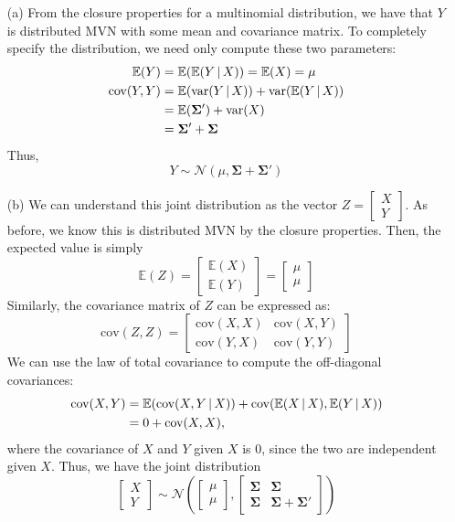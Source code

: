 \documentclass[submit]{harvardml}
\newcommand{\E}{\mathbb{E}}
\newcommand{\cov}{\text{cov}}
\renewcommand{\v}[1]{\mathbf{#1}}
\begin{document}
\begin{enumerate}
	\item[(a)] From the closure properties for a multinomial distribution, we have that $Y$ is distributed MVN with some mean and covariance matrix. To completely specify the distribution, we need only compute these two parameters:
	\begin{align*}
	\E(Y) &= \E(\E(Y\given X))  = \E(X) = \mu \\
	\cov(Y, Y) &= \E(\var(Y\given X)) + \var(\E(Y\given X)) \\
	&= \E(\v\Sigma') + \var(X) \\
	&= \v\Sigma' + \v{\Sigma}
	\end{align*}
	Thus,
	\[Y\sim\mathcal{N}(\mu, \v{\Sigma + \v{\Sigma'}})\]
	
	\item[(b)] We can understand this joint distribution as the vector 
	$Z = \begin{bmatrix} X \\ Y\end{bmatrix}$. As before, we know this is distributed MVN by the closure properties. Then, the expected value is simply
	\[ \E(Z) 
	= \begin{bmatrix} \E(X) \\ \E(Y)\end{bmatrix} 
	= \begin{bmatrix} \mu \\ \mu\end{bmatrix} \]
	Similarly, the covariance matrix of $Z$ can be expressed as:
	\[ \cov(Z, Z)
	= \begin{bmatrix} \cov(X, X) & \cov(X, Y) \\ \cov(Y, X) & \cov(Y, Y)\end{bmatrix} \]
	We can use the law of total covariance to compute the off-diagonal covariances:
	\begin{align*}
	\cov(X, Y) &= \E(\cov(X, Y\given X)) + \cov(\E(X\given X), \E(Y\given X)) \\
	&= 0 + \cov(X, X),
	\end{align*}
	where the covariance of $X$ and $Y$ given $X$ is 0, since the two are independent given $X$. Thus, we have the joint distribution
	\[
	\begin{bmatrix} X \\ Y\end{bmatrix} \sim
	\mathcal{N}\left(
	\begin{bmatrix} \mu \\ \mu\end{bmatrix},
	\begin{bmatrix} \v\Sigma & \v\Sigma \\ \v\Sigma & \v\Sigma + \v\Sigma' \end{bmatrix}
	\right)
	\]
\end{enumerate}
\end{document}
